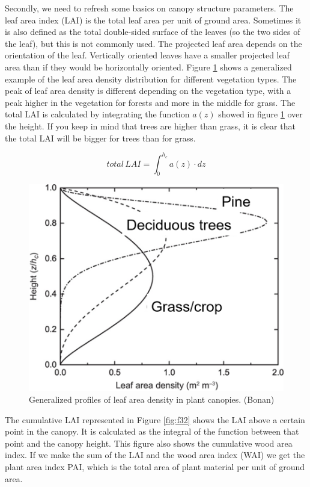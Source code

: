 \documentclass[
  12pt,
  oneside]{book}
\begin{document}
Secondly, we need to refresh some basics on canopy structure parameters. The leaf area index (LAI) is the total leaf area per unit of ground area. Sometimes it is also defined as the total double-sided surface of the leaves (so the two sides of the leaf), but this is not commonly used. The projected leaf area depends on the orientation of the leaf. Vertically oriented leaves have a smaller projected leaf area than if they would be horizontally oriented. Figure \ref{fig:f31} shows a generalized example of the leaf area density distribution for different vegetation types. The peak of leaf area density is different depending on the vegetation type, with a peak higher in the vegetation for forests and more in the middle for grass. The total LAI is calculated by integrating the function \(a(z)\) showed in figure \ref{fig:f31} over the height. If you keep in mind that trees are higher than grass, it is clear that the total LAI will be bigger for trees than for grass.

\[
total \, LAI = \int_0^{h_c}a(z) \cdot dz
\]

\begin{figure}

{\centering \includegraphics[width=0.8\linewidth]{figures/chap3/f31_LAD} 

}

\caption{Generalized profiles of leaf area density in plant canopies. (Bonan)}\label{fig:f31}
\end{figure}

The cumulative LAI represented in Figure \ref{fig:f32} shows the LAI above a certain point in the canopy. It is calculated as the integral of the function between that point and the canopy height. This figure also shows the cumulative wood area index. If we make the sum of the LAI and the wood area index (WAI) we get the plant area index PAI, which is the total area of plant material per unit of ground area.
\end{document}

